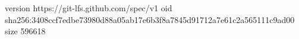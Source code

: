 version https://git-lfs.github.com/spec/v1
oid sha256:3408ccf7edbe73980d88a05ab17e6b3f8a7845d91712a7e61c2a565111c9ad00
size 596618
